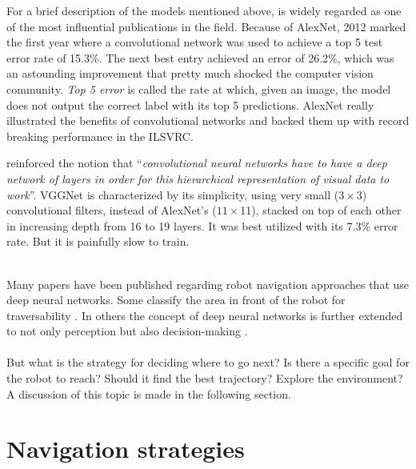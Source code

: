 \documentclass[12pt,a4paper]{report}
\newcommand{\defn}[1]{\enquote{\textit{#1}}}
\newcommand{\term}{\textit}
\newcommand{\acronym}{\MakeUppercase}
\begin{document}
	For a brief description of the models mentioned above, \citet{Krizhevsky_alexnet} 
	is widely regarded as one of the most influential publications in the field. Because 
	of AlexNet, 2012 marked the first year where a convolutional network was used to 
	achieve a top 5 test error rate of 15.3\%. The next best entry achieved an error 
	of 26.2\%, which was an astounding improvement that pretty much shocked the computer 
	vision community. \term{Top 5 error} is called the rate at which, given an image, 
	the model does not output the correct label with its top 5 predictions. AlexNet 
	really illustrated the benefits of convolutional networks and backed them up with 
	record breaking performance in the \acronym{ilsvrc}.
	\par
	\citet{Simonyan_vgg} reinforced the notion that \defn{convolutional neural networks 
	have to have a deep network of layers in order for this hierarchical representation 
	of visual data to work}. VGGNet is characterized by its simplicity, using very small 
	($3\times$3) convolutional filters, instead of AlexNet’s ($11\times$11), stacked on 
	top of each other in increasing depth from 16 to 19 layers. It was best utilized with 
	its 7.3\% error rate. But it is painfully slow to train.
	\\
	\\
	
	
	Many papers have been published regarding robot navigation approaches that use 
	deep neural networks. Some classify the area in front of the robot for traversability 
	\citep{Sermanet, Hadsell}. In others the concept of deep neural networks is further 
	extended to not only perception but also decision-making \citep{Tai}.
	\\\\
	
	
	But what is the strategy for deciding where to go next? Is there a specific goal 
	for the robot to reach? Should it find the best trajectory? Explore the 
	environment? A discussion of this topic is made in the following section.
	\\
	
	\section{Navigation strategies}
	\label{sec:bg:goals}
	
\end{document}
